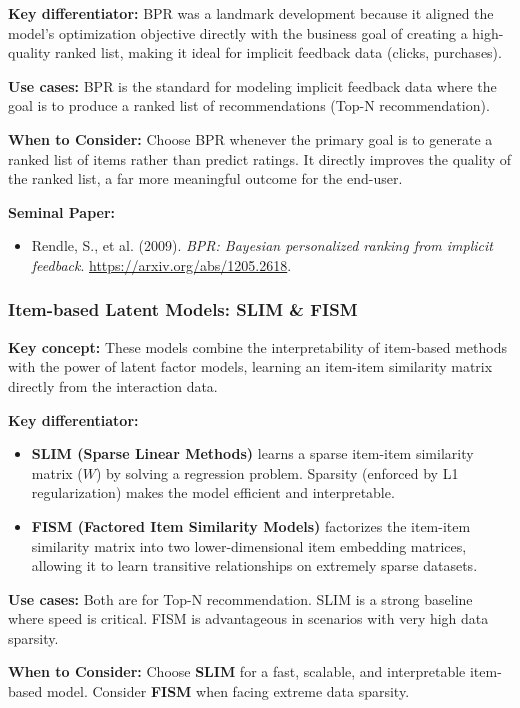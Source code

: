 \documentclass{article}
\begin{document}
\noindent\textbf{Key differentiator:} BPR was a landmark development because it aligned the model's optimization objective directly with the business goal of creating a high-quality ranked list, making it ideal for implicit feedback data (clicks, purchases).

\noindent\textbf{Use cases:} BPR is the standard for modeling implicit feedback data where the goal is to produce a ranked list of recommendations (Top-N recommendation).

\noindent\textbf{When to Consider:} Choose BPR whenever the primary goal is to generate a ranked list of items rather than predict ratings. It directly improves the quality of the ranked list, a far more meaningful outcome for the end-user.

\noindent\textbf{Seminal Paper:}
    \begin{itemize}
        \item Rendle, S., et al. (2009). \textit{BPR: Bayesian personalized ranking from implicit feedback}. \url{https://arxiv.org/abs/1205.2618}.
    \end{itemize}

    \subsubsection{Item-based Latent Models: SLIM \& FISM}
\noindent\textbf{Key concept:} These models combine the interpretability of item-based methods with the power of latent factor models, learning an item-item similarity matrix directly from the interaction data.

\noindent\textbf{Key differentiator:}
    \begin{itemize}
        \item \textbf{SLIM (Sparse Linear Methods)} learns a sparse item-item similarity matrix ($W$) by solving a regression problem. Sparsity (enforced by L1 regularization) makes the model efficient and interpretable.
        \item \textbf{FISM (Factored Item Similarity Models)} factorizes the item-item similarity matrix into two lower-dimensional item embedding matrices, allowing it to learn transitive relationships on extremely sparse datasets.
    \end{itemize}
\noindent\textbf{Use cases:} Both are for Top-N recommendation. SLIM is a strong baseline where speed is critical. FISM is advantageous in scenarios with very high data sparsity.

\noindent\textbf{When to Consider:} Choose \textbf{SLIM} for a fast, scalable, and interpretable item-based model. Consider \textbf{FISM} when facing extreme data sparsity.
\end{document}
